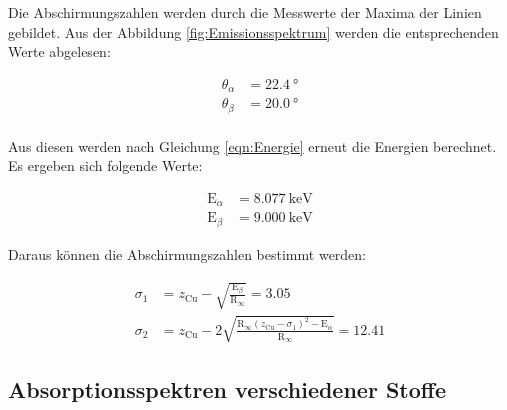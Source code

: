 Die Abschirmungszahlen werden durch die Messwerte der Maxima der Linien gebildet.
Aus der Abbildung \ref{fig:Emissionsspektrum} werden die entsprechenden Werte abgelesen:

\begin{align*}
  \theta_{\alpha} &= \SI{22.4}{\degree} \\
  \theta_{\beta} &= \SI{20.0}{\degree} \\
\end{align*}

Aus diesen werden nach Gleichung \eqref{eqn:Energie} erneut die Energien berechnet.
Es ergeben sich folgende Werte:

\begin{align*}
  \text{E}_{\alpha} &= \SI{8.077}{\kilo\electronvolt} \\
  \text{E}_{\beta} &= \SI{9.000}{\kilo\electronvolt}
\end{align*}

Daraus können die Abschirmungszahlen bestimmt werden:

\begin{align*}
  \sigma_1 &= z_\text{Cu} - \sqrt{\frac{\text{E}_{\beta}}{\text{R}_{\infty}}} = 3.05\\
  \sigma_2 &= z_\text{Cu} - 2\sqrt{\frac{\text{R}_{\infty} \left(z_\text{Cu} - \sigma_1 \right)^2 - \text{E}_{\alpha}}{\text{R}_{\infty}}} = 12.41
\end{align*}

\subsection{Absorptionsspektren verschiedener Stoffe}
